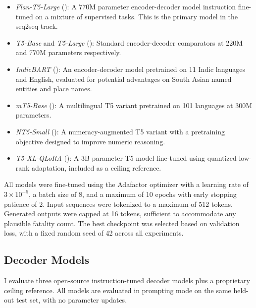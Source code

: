 \documentclass[
  11pt,
]{article}
\providecommand{\tightlist}{%
  \setlength{\itemsep}{0pt}\setlength{\parskip}{0pt}}
\begin{document}
\begin{itemize}
\tightlist
\item
  \emph{Flan-T5-Large} (): A
  770M parameter encoder-decoder model instruction fine-tuned on a
  mixture of supervised tasks. This is the primary model in the seq2seq
  track.
\item
  \emph{T5-Base} and \emph{T5-Large} (): Standard encoder-decoder comparators at 220M and 770M
  parameters respectively.
\item
  \emph{IndicBART} (): An
  encoder-decoder model pretrained on 11 Indic languages and English,
  evaluated for potential advantages on South Asian named entities and
  place names.
\item
  \emph{mT5-Base} (): A
  multilingual T5 variant pretrained on 101 languages at 300M
  parameters.
\item
  \emph{NT5-Small} (): A numeracy-augmented T5 variant with a pretraining
  objective designed to improve numeric reasoning.
\item
  \emph{T5-XL-QLoRA} (): A 3B parameter T5 model fine-tuned using quantized low-rank
  adaptation, included as a ceiling reference.
\end{itemize}

All models were fine-tuned using the Adafactor optimizer with a learning
rate of \(3 \times 10^{-5}\), a batch size of 8, and a maximum of 10
epochs with early stopping patience of 2. Input sequences were tokenized
to a maximum of 512 tokens. Generated outputs were capped at 16 tokens,
sufficient to accommodate any plausible fatality count. The best
checkpoint was selected based on validation loss, with a fixed random
seed of 42 across all experiments.

\subsection{Decoder Models}\label{decoder-models}

I evaluate three open-source instruction-tuned decoder models plus a
proprietary ceiling reference. All models are evaluated in prompting
mode on the same held-out test set, with no parameter updates.
\end{document}
